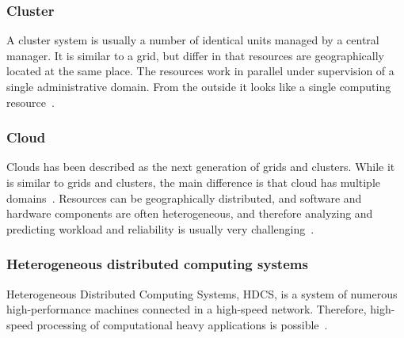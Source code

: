 \documentclass{cslthse-msc}
\begin{document}

\subsubsection{Cluster}
A cluster system is usually a number of identical units managed by a central manager. It is similar to a grid, but differ in that resources are geographically located at the same place. The resources work in parallel under supervision of a single administrative domain. From the outside it looks like a single computing resource~\cite{compStudyLoadAndCloud}.

\subsubsection{Cloud}
Clouds has been described as the next generation of grids and clusters. While it is similar to grids and clusters, the main difference is that cloud has multiple domains~\cite{compStudyLoadAndCloud}. Resources can be geographically distributed, and software and hardware components are often heterogeneous, and therefore analyzing and predicting workload and reliability is usually very challenging~\cite{surveyReliabilityDistr}. 



\subsubsection{Heterogeneous distributed computing systems}
Heterogeneous Distributed Computing Systems, HDCS, is a system of numerous high-performance machines connected in a high-speed network. Therefore, high-speed processing of computational heavy applications is possible~\cite{algoMinExTime}. %
\end{document}
